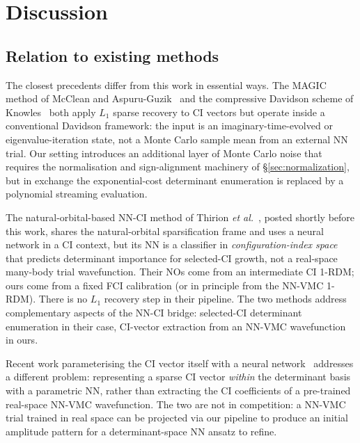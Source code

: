 \documentclass[journal=jctcce,manuscript=article,layout=traditional]{achemso}
\begin{document}
\section{Discussion}
\label{sec:discussion}

\subsection{Relation to existing methods}

The closest precedents differ from this work in essential ways. The
MAGIC method of McClean and Aspuru-Guzik~\cite{McClean2015MAGIC} and
the compressive Davidson scheme of Knowles~\cite{Knowles2015compressive}
both apply $L_1$ sparse recovery to CI vectors but operate inside a
conventional Davidson framework: the input is an imaginary-time-evolved
or eigenvalue-iteration state, not a Monte Carlo sample mean from an
external NN trial. Our setting introduces an additional layer of Monte
Carlo noise that requires the normalisation and sign-alignment
machinery of \S\ref{sec:normalization}, but in exchange the
exponential-cost determinant enumeration is replaced by a polynomial
streaming evaluation.

The natural-orbital-based NN-CI method of Thirion
\emph{et al.}~\cite{Thirion2025NONNCI}, posted shortly before this
work, shares the natural-orbital sparsification frame and uses a
neural network in a CI context, but its NN is a classifier in
\emph{configuration-index space} that predicts determinant importance
for selected-CI growth, not a real-space many-body trial wavefunction.
Their NOs come from an intermediate CI 1-RDM; ours come from a
fixed FCI calibration (or in principle from the NN-VMC 1-RDM). There
is no $L_1$ recovery step in their pipeline. The two methods address
complementary aspects of the NN-CI bridge: selected-CI determinant
enumeration in their case, CI-vector extraction from an NN-VMC
wavefunction in ours.

Recent work parameterising the CI vector itself with a neural
network~\cite{Liu2024NNBackflow,Liu2025NNBackflowOpt,Carleo2017NQS}
addresses a different problem: representing a sparse CI vector
\emph{within} the determinant basis with a parametric NN, rather than
extracting the CI coefficients of a pre-trained real-space NN-VMC
wavefunction. The two are not in competition: a NN-VMC trial trained
in real space can be projected via our pipeline to produce an initial
amplitude pattern for a determinant-space NN ansatz to refine.
\end{document}
